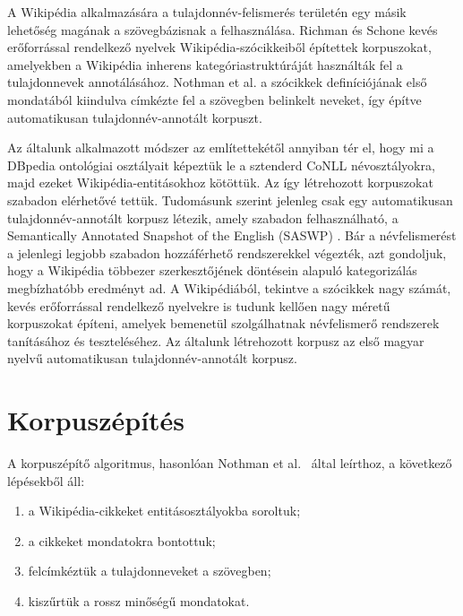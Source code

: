 \documentclass{llncs}
\begin{document}
A Wikipédia alkalmazására a tulajdonnév-felismerés területén egy másik lehetőség magának a szövegbázisnak a felhasználása. Richman és Schone \cite{Richman} kevés erőforrással rendelkező nyelvek Wikipédia-szócikkeiből építettek korpuszokat, amelyekben a Wikipédia inherens kategóriastruktúráját használták fel a tulajdonnevek annotálásához. Nothman et al. \cite{Nothman:2008} a szócikkek definíciójának első mondatából kiindulva címkézte fel a szövegben belinkelt neveket, így építve automatikusan tulajdonnév-annotált korpuszt. 

Az általunk alkalmazott módszer az említettekétől annyiban tér el, hogy mi a DBpedia ontológiai osztályait képeztük le a sztenderd CoNLL névosztályokra, majd ezeket Wikipédia-entitásokhoz kötöttük. Az így létrehozott korpuszokat szabadon elérhetővé tettük. Tudomásunk szerint jelenleg csak egy automatikusan tulajdonnév-annotált korpusz létezik, amely szabadon felhasználható, a Semantically Annotated Snapshot of the English (SASWP) \cite{Zaragoza}. Bár a névfelismerést a jelenlegi legjobb szabadon hozzáférhető rendszerekkel végezték, azt gondoljuk, hogy a Wikipédia többezer szerkesztőjének döntésein alapuló kategorizálás megbízhatóbb eredményt ad. A Wikipédiából, tekintve a szócikkek nagy számát, kevés erőforrással rendelkező nyelvekre is tudunk kellően nagy méretű korpuszokat építeni, amelyek bemenetül szolgálhatnak névfelismerő rendszerek tanításához és teszteléséhez. Az általunk létrehozott korpusz az első magyar nyelvű automatikusan tulajdonnév-annotált korpusz. 

\section{Korpuszépítés}

A korpuszépítő algoritmus, hasonlóan Nothman et al.~\cite{Nothman:08} által
leírthoz, a következő lépésekből áll:

\begin{enumerate}
\item a Wikipédia-cikkeket entitásosztályokba soroltuk;
\item a cikkeket mondatokra bontottuk;
\item felcímkéztük a tulajdonneveket a szövegben;
\item kiszűrtük a rossz minőségű mondatokat.
\end{enumerate}
\end{document}
